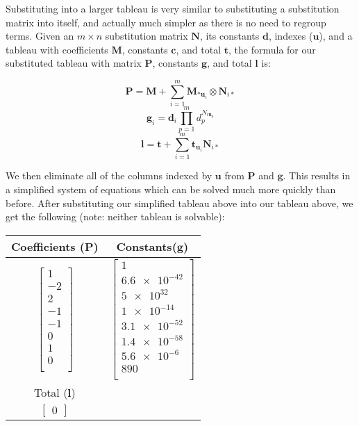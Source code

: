 \documentclass{article}
\newcommand{\matr}[1]{\bm{#1}}
\newcommand{\vect}[1]{\bm{#1}}
\begin{document}
Substituting into a larger tableau is very similar to substituting a substitution matrix into itself, and actually much simpler as there is no need to regroup terms. Given an $m \times n$ substitution matrix $\matr{N}$, its constants $\vect{d}$, indexes ($\vect{u}$), and a tableau with coefficients $\matr{M}$, constants $\vect{c}$, and total $\vect{t}$, the formula for our substituted tableau with matrix $\matr{P}$, constants $\vect{g}$, and total $\vect{l}$ is:

\begin{equation*}
    \matr{P}=\matr{M}+\sum_{i=1}^{m}\matr{M}_{*\vect{u}_i}\otimes\matr{N}_{i*}
\end{equation*}
\begin{equation*}
    \vect{g}_i=\vect{d}_i\prod_{p=1}^m d_p^{N_{i\vect{u}_p}}
\end{equation*}
\begin{equation*}
    \vect{l}=\vect{t}+\sum_{i=1}^{m}\vect{t}_{\vect{u}_i}\matr{N}_{i*}
\end{equation*}

We then eliminate all of the columns indexed by $\vect{u}$ from $\matr{P}$ and $\vect{g}$. This results in a simplified system of equations which can be solved much more quickly than before. After substituting our simplified tableau above into our tableau above, we get the following (note: neither tableau is solvable):

\begin{center}
    \begin{tabular}{c|c}
    Coefficients ($\matr{P}$) & Constants($\vect{g}$) \\
    \hline
    $\begin{bmatrix}
        1 \\
        -2 \\
        2 \\
        -1 \\
        -1 \\
        0 \\
        1 \\
        0 \\
    \end{bmatrix}$ &
    $\begin{bmatrix}
        1\\
        \num{6.6e-42} \\
        \num{5e32} \\
        \num{1e-14} \\
        \num{3.1e-52} \\
        \num{1.4e-58} \\
        \num{5.6e-6} \\
        \num{890} \\
    \end{bmatrix}$ \\
    \hline
     Total ($\vect{l}$)  \\
     \hline
    $\begin{bmatrix}
       0
    \end{bmatrix}$
    \end{tabular}
\end{center}
\end{document}

